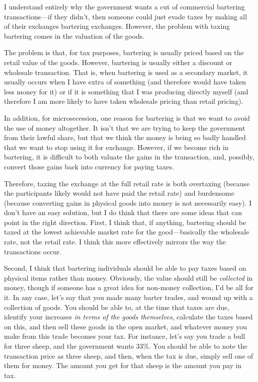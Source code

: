 \begin{policynote}
I understand entirely why the government wants a cut of commercial 
bartering transactions---if they didn't,
then someone could just evade taxes by making all of their exchanges bartering exchanges.
However, the problem with taxing bartering comes in the valuation of the goods.

The problem is that, for tax purposes, bartering is usually priced based on the retail value
of the goods.  However, bartering is usually either a discount or wholesale transaction.
That is, when bartering is used as a secondary market, it usually occurs when I have extra
of something (and therefore would have taken less money for it) or if it is something
that I was producing directly myself (and therefore I am more likely to have taken 
wholesale pricing than retail pricing). 

In addition, for microsecession, one reason for bartering is that we want to avoid the
use of money altogether.  It isn't that we are trying to keep the government from their lawful
share, but that we think the money is being so badly handled that we want to stop
using it for exchange.  However, if we become rich in bartering, it is difficult to
both valuate the gains in the transaction, and, possibly, convert those gains back
into currency for paying taxes.

Therefore, taxing the exchange at the full retail rate is both overtaxing (because the 
participants likely would not have paid the retail rate) and burdensome (because converting
gains in physical goods into money is not necessarily easy).  I don't have an easy
solution, but I do think that there are some ideas that can point in the right direction.
First, I think that, if anything, bartering should be taxed at the lowest achievable market
rate for the good---basically the wholesale rate, not the retail rate.  I think this more
effectively mirrors the way the transactions occur.  

Second, I think that bartering individuals
should be able to pay taxes based on physical items rather than money.  Obviously, the
value should still be \textit{collected} in money, though if someone has a great
idea for non-money collection, I'd be all for it.  In any case, let's say that you made
many barter trades, and wound up with a collection of goods.  You should be able to,
at the time that taxes are due, identify your increases \textit{in terms of the goods themselves},
calculate the taxes based on this, and then sell these goods in the open market, and whatever
money you make from this trade becomes your tax.  For instance, let's say you trade a bull
for three sheep, and the government wants 33\%.  You should be able to note the transaction
price as three sheep, and then, when the tax is due, simply sell one of them for money.  The amount 
you get for that sheep is the amount you pay in tax.


\end{policynote}
